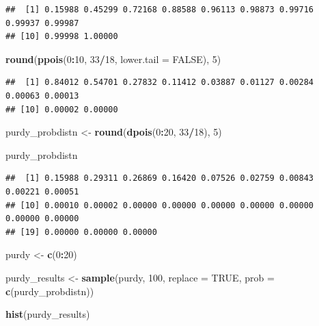 \documentclass[
]{article}
\newenvironment{Shaded}{\begin{snugshade}}{\end{snugshade}}
\newcommand{\AttributeTok}[1]{\textcolor[rgb]{0.13,0.29,0.53}{#1}}
\newcommand{\ConstantTok}[1]{\textcolor[rgb]{0.56,0.35,0.01}{#1}}
\newcommand{\DecValTok}[1]{\textcolor[rgb]{0.00,0.00,0.81}{#1}}
\newcommand{\FunctionTok}[1]{\textcolor[rgb]{0.13,0.29,0.53}{\textbf{#1}}}
\newcommand{\NormalTok}[1]{#1}
\newcommand{\OtherTok}[1]{\textcolor[rgb]{0.56,0.35,0.01}{#1}}
\newcommand{\SpecialCharTok}[1]{\textcolor[rgb]{0.81,0.36,0.00}{\textbf{#1}}}
\begin{document}
\begin{verbatim}
##  [1] 0.15988 0.45299 0.72168 0.88588 0.96113 0.98873 0.99716 0.99937 0.99987
## [10] 0.99998 1.00000
\end{verbatim}

\begin{Shaded}
\begin{Highlighting}[]
\FunctionTok{round}\NormalTok{(}\FunctionTok{ppois}\NormalTok{(}\DecValTok{0}\SpecialCharTok{:}\DecValTok{10}\NormalTok{, }\DecValTok{33}\SpecialCharTok{/}\DecValTok{18}\NormalTok{, }\AttributeTok{lower.tail =} \ConstantTok{FALSE}\NormalTok{), }\DecValTok{5}\NormalTok{)}
\end{Highlighting}
\end{Shaded}

\begin{verbatim}
##  [1] 0.84012 0.54701 0.27832 0.11412 0.03887 0.01127 0.00284 0.00063 0.00013
## [10] 0.00002 0.00000
\end{verbatim}

\begin{Shaded}
\begin{Highlighting}[]
\NormalTok{purdy\_probdistn }\OtherTok{\textless{}{-}} \FunctionTok{round}\NormalTok{(}\FunctionTok{dpois}\NormalTok{(}\DecValTok{0}\SpecialCharTok{:}\DecValTok{20}\NormalTok{, }\DecValTok{33}\SpecialCharTok{/}\DecValTok{18}\NormalTok{), }\DecValTok{5}\NormalTok{)}

\NormalTok{purdy\_probdistn}
\end{Highlighting}
\end{Shaded}

\begin{verbatim}
##  [1] 0.15988 0.29311 0.26869 0.16420 0.07526 0.02759 0.00843 0.00221 0.00051
## [10] 0.00010 0.00002 0.00000 0.00000 0.00000 0.00000 0.00000 0.00000 0.00000
## [19] 0.00000 0.00000 0.00000
\end{verbatim}

\begin{Shaded}
\begin{Highlighting}[]
\NormalTok{purdy }\OtherTok{\textless{}{-}} \FunctionTok{c}\NormalTok{(}\DecValTok{0}\SpecialCharTok{:}\DecValTok{20}\NormalTok{)}

\NormalTok{purdy\_results }\OtherTok{\textless{}{-}} \FunctionTok{sample}\NormalTok{(purdy, }\DecValTok{100}\NormalTok{, }\AttributeTok{replace =} \ConstantTok{TRUE}\NormalTok{, }\AttributeTok{prob =} \FunctionTok{c}\NormalTok{(purdy\_probdistn))}

\FunctionTok{hist}\NormalTok{(purdy\_results)}
\end{Highlighting}
\end{Shaded}
\end{document}
